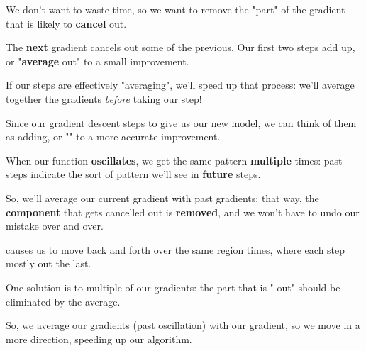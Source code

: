             We don't want to waste time, so we want to remove the "part" of the gradient that is likely to \textbf{cancel} out. 
            
            The \textbf{next} gradient cancels out some of the previous. Our first two steps add up, or "\textbf{average} out" to a small improvement.
            
            If our steps are effectively "averaging", we'll speed up that process: we'll average together the gradients \textit{before} taking our step!
                \\
                
            \begin{concept}
                Since our gradient descent steps  to give us our new model, we can think of them as adding, or "" to a more accurate improvement.
            \end{concept}
            
            
            When our function \textbf{oscillates}, we get the same pattern \textbf{multiple} times: past steps indicate the sort of pattern we'll see in \textbf{future} steps. 
            
            So, we'll average our current gradient with past gradients: that way, the \textbf{component} that gets cancelled out is \textbf{removed}, and we won't have to undo our mistake over and over.\\
            
            \begin{concept}
                 causes us to move back and forth over the same region  times, where each step mostly  out the last.
                
                One solution is to  multiple of our gradients: the part that is " out" should be eliminated by the average.
                
                So, we average our  gradients (past oscillation) with our  gradient, so we move in a more  direction, speeding up our algorithm.
            \end{concept}
            
